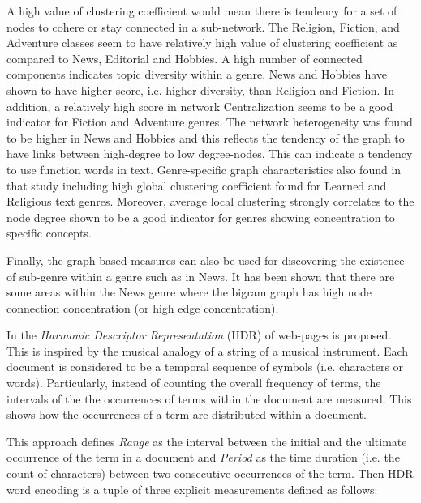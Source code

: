 A high value of clustering coefficient would mean there is tendency for a set of nodes to cohere or stay connected in a sub-network. The Religion, Fiction, and Adventure classes seem to have relatively high value of clustering coefficient as compared to News, Editorial and Hobbies. A high number of connected components indicates topic diversity within a genre. News and Hobbies have shown to have higher score, i.e. higher diversity, than Religion and Fiction. In addition, a relatively high score in network Centralization seems to be a good indicator for Fiction and Adventure genres. The network heterogeneity was found to be higher in News and Hobbies and this reflects the tendency of the graph to have links between high-degree to low degree-nodes. This can indicate a tendency to use function words in text. Genre-specific graph characteristics also found in that study \parencite{nabhan2016graph} including high global clustering coefficient found for Learned and Religious text genres. Moreover, average local clustering strongly correlates to the node degree shown to be a good indicator for genres showing concentration to specific concepts.

Finally, the graph-based measures can also be used for discovering the existence of sub-genre within a genre such as in News. It has been shown that there are some areas within the News genre where the bigram graph has high node connection concentration (or high edge concentration).  

In \parencite{kim2010formulating} the \textit{Harmonic Descriptor Representation} (HDR) of web-pages is proposed. This is inspired by the musical analogy of a string of a musical instrument. Each document is considered to be a temporal sequence of symbols (i.e. characters or words). Particularly, instead of counting the overall frequency of terms,  the intervals of the the occurrences of terms within the document are measured. This shows how the occurrences of a term are distributed within a document.

This approach defines \textit{Range} as the interval between the initial and the ultimate occurrence of the term in a document and \textit{Period} as the time duration (i.e. the count of characters) between two consecutive occurrences of the term. Then HDR word encoding is a tuple of three explicit measurements defined as follows:

